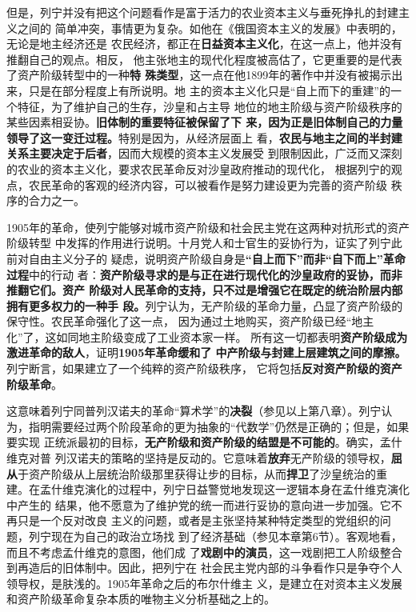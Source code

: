 但是，列宁并没有把这个问题看作是富于活力的农业资本主义与垂死挣扎的封建主义之间的
简单冲突，事情更为复杂。如他在《俄国资本主义的发展》中表明的，无论是地主经济还是
农民经济，都正在\textbf{日益资本主义化}，在这一点上，他并没有推翻自己的观点。相反，
他主张地主的现代化程度被高估了，它更重要的是代表了资产阶级转型中的一种\textbf{特
  殊类型}，这一点在他1899年的著作中并没有被揭示出来，只是在部分程度上有所说明。地
主的资本主义化只是“自上而下的重建”的一个特征，为了维护自己的生存，沙皇和占主导
地位的地主阶级与资产阶级秩序的某些因素相妥协。\textbf{旧体制的重要特征被保留了下
  来，因为正是旧体制自己的力量领导了这一变迁过程。}特别是因为，从经济层面上
看，\textbf{农民与地主之间的半封建关系主要决定于后者}，因而大规模的资本主义发展受
到限制因此，广泛而又深刻的农业的资本主义化，要求农民革命反对沙皇政府推动的现代化，
根据列宁的观点，农民革命的客观的经济内容，可以被看作是努力建设更为完善的资产阶级
秩序的合力之一。

1905年的革命，使列宁能够对城市资产阶级和社会民主党在这两种对抗形式的资产阶级转型
中发挥的作用进行说明。十月党人和士官生的妥协行为，证实了列宁此前对自由主义分子的
疑虑，说明资产阶级自身是\textbf{“自上而下”而非“自下而上”革命过程}中的行动
者：\textbf{资产阶级寻求的是与正在进行现代化的沙皇政府的妥协，而非推翻它们。资产
  阶级对人民革命的支持，只不过是增强它在既定的统治阶层内部拥有更多权力的一种手
  段。}列宁认为，无产阶级的革命力量，凸显了资产阶级的保守性。农民革命强化了这一点，
因为通过土地购买，资产阶级已经“地主化”了，这如同地主阶级变成了工业资本家一样。
所有这一切都表明\textbf{资产阶级成为激进革命的敌人}，证明\textbf{1905年革命缓和了
  中产阶级与封建上层建筑之间的摩擦。}列宁断言，如果建立了一个纯粹的资产阶级秩序，
它将包括\textbf{反对资产阶级的资产阶级革命}。

这意味着列宁同普列汉诺夫的革命“算术学”的\textbf{决裂}（参见以上第八章）。列宁认
为，指明需要经过两个阶段革命的更为抽象的“代数学”仍然是正确的；但是，如果要实现
正统派最初的目标，\textbf{无产阶级和资产阶级的结盟是不可能的}。确实，孟什维克对普
列汉诺夫的策略的坚持是反动的。它意味着\textbf{放弃}无产阶级的领导权，\textbf{屈
  从}于资产阶级从上层统治阶级那里获得让步的目标，从而\textbf{捍卫}了沙皇统治的重
建。在孟什维克演化的过程中，列宁日益警觉地发现这一逻辑本身在孟什维克演化中产生的
结果，他不愿意为了维护党的统一而进行妥协的意向进一步加强。它不再只是一个反对改良
主义的问题，或者是主张坚持某种特定类型的党组织的问题，列宁现在为自己的政治立场找
到了经济基础（参见本章第6节）。客观地看，而且不考虑孟什维克的意图，他们成
了\textbf{戏剧中的演员}，这一戏剧把工人阶级整合到再造后的旧体制中。因此，把列宁在
社会民主党内部的斗争看作只是争夺个人领导权，是肤浅的。1905年革命之后的布尔什维主
义，是建立在对资本主义发展和资产阶级革命复杂本质的唯物主义分析基础之上的。

